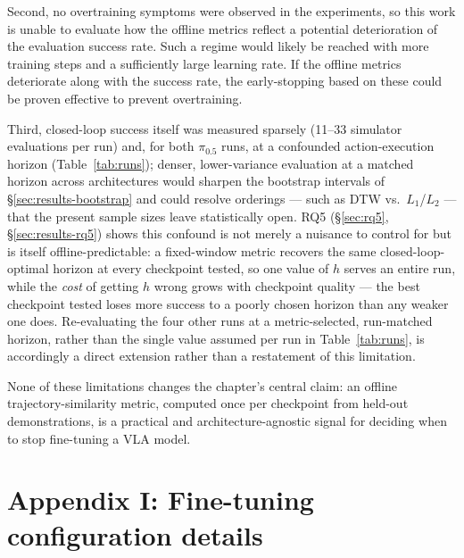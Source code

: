 \documentclass[english,12pt,a4paper,pdftex,elec,utf8]{aaltothesis}
\begin{document}
Second, no overtraining symptoms were observed in the experiments, so this work is unable to evaluate how the offline metrics reflect a potential deterioration of the evaluation success rate. Such a regime would likely be reached with more training steps and a sufficiently large learning rate. If the offline metrics deteriorate along with the success rate, the early-stopping based on these could be proven effective to prevent overtraining.

Third, closed-loop success itself was measured sparsely (11--33 simulator evaluations per run) and, for both $\pi_{0.5}$ runs, at a confounded action-execution horizon (Table~\ref{tab:runs}); denser, lower-variance evaluation at a matched horizon across architectures would sharpen the bootstrap intervals of \S\ref{sec:results-bootstrap} and could resolve orderings --- such as DTW vs.\ $L_1$/$L_2$ --- that the present sample sizes leave statistically open. RQ5 (\S\ref{sec:rq5}, \S\ref{sec:results-rq5}) shows this confound is not merely a nuisance to control for but is itself offline-predictable: a fixed-window metric recovers the same closed-loop-optimal horizon at every checkpoint tested, so one value of $h$ serves an entire run, while the \emph{cost} of getting $h$ wrong grows with checkpoint quality --- the best checkpoint tested loses more success to a poorly chosen horizon than any weaker one does. Re-evaluating the four other runs at a metric-selected, run-matched horizon, rather than the single value assumed per run in Table~\ref{tab:runs}, is accordingly a direct extension rather than a restatement of this limitation. 

None of these limitations changes the chapter's central claim: an offline trajectory-similarity metric, computed once per checkpoint from held-out demonstrations, is a practical and architecture-agnostic signal for deciding when to stop fine-tuning a VLA model.


\clearpage

{}



 


\clearpage
\thesisappendix

\clearpage
\section{Appendix I: Fine-tuning configuration details}
\label{app:ft}
\end{document}
